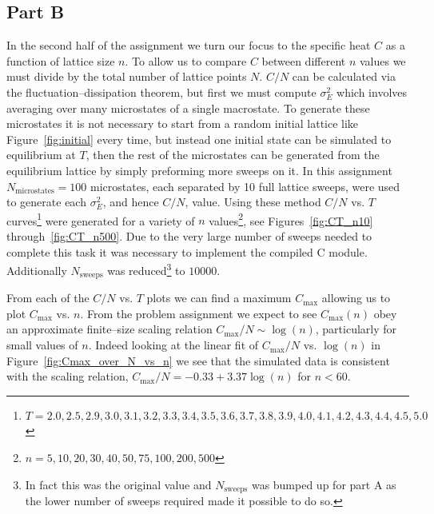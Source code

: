 \documentclass[notitlepage,aps,prd,nofootinbib]{revtex4-1}
\begin{document}
\clearpage
\subsection{Part B}
\label{subsec:results_part_b}
In the second half of the assignment we turn our focus to the specific heat $C$ as a function of lattice size $n$. To allow us to compare $C$ between different $n$ values we must divide by the total number of lattice points $N$. $C/N$ can be calculated via the fluctuation--dissipation theorem, but first we must compute $\sigma_{E}^{2}$ which involves averaging over many microstates of a single macrostate. To generate these microstates it is not necessary to start from a random initial lattice like Figure~\ref{fig:initial} every time, but instead one initial state can be simulated to equilibrium at $T$, then the rest of the microstates can be generated from the equilibrium lattice by simply preforming more sweeps on it. In this assignment $N_{\mathrm{microstates}} = 100$ microstates, each separated by 10 full lattice sweeps, were used to generate each $\sigma_{E}^{2}$, and hence $C/N$, value. Using these method $C/N$ vs. $T$ curves\footnote{$T = 2.0, 2.5, 2.9, 3.0, 3.1, 3.2, 3.3, 3.4, 3.5, 3.6, 3.7, 3.8, 3.9, 4.0, 4.1, 4.2, 4.3, 4.4, 4.5, 5.0$} were generated for a variety of $n$ values\footnote{$n = 5, 10, 20, 30, 40, 50, 75, 100, 200, 500$}, see Figures~\ref{fig:CT_n10} through~\ref{fig:CT_n500}. Due to the very large number of sweeps needed to complete this task it was necessary to implement the compiled C module. Additionally $N_{\mathrm{sweeps}}$ was reduced\footnote{In fact this was the original value and $N_{\mathrm{sweeps}}$ was bumped up for part A as the lower number of sweeps required made it possible to do so.} to $10000$.

From each of the $C/N$ vs. $T$ plots we can find a maximum $C_{\mathrm{max}}$ allowing us to plot $C_{\mathrm{max}}$ vs. $n$. From the problem assignment we expect to see $C_{\mathrm{max}}\left(n\right)$ obey an approximate finite--size scaling relation $C_{\mathrm{max}}/N \sim \log(n)$, particularly for small values of $n$. Indeed looking at the linear fit of  $C_{\mathrm{max}}/N$ vs. $\log(n)$ in Figure~\ref{fig:Cmax_over_N_vs_n} we see that the simulated data is consistent with the scaling relation, $C_{\mathrm{max}}/N = -0.33 + 3.37 \log(n)$ for $n < 60$.
\end{document}
